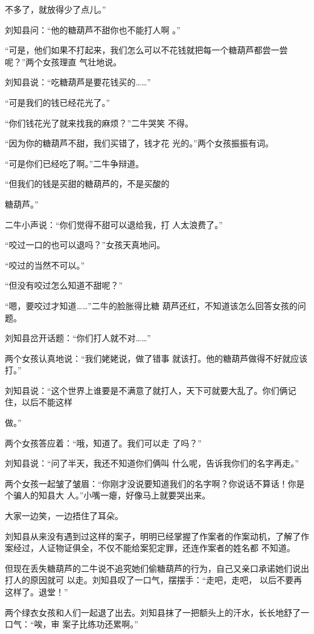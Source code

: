 \documentclass{article}
\begin{document}
\newpage
不多了，就放得少了点儿。” 

刘知县问：“他的糖葫芦不甜你也不能打人啊
。” 

“可是，他们如果不打起来，我们怎么可以不花钱就把每一个糖葫芦都尝一尝呢？”两个女孩理直
气壮地说。 


刘知县说：“吃糖葫芦是要花钱买的……” 


“可是我们的钱已经花光了。” 

“你们钱花光了就来找我的麻烦？”二牛哭笑
不得。 

“因为你的糖葫芦不甜，我们买错了，钱才花
光的。”两个女孩振振有词。 


“可是你们已经吃了啊。”二牛争辩道。 

“但我们的钱是买甜的糖葫芦的，不是买酸的
\newpage

糖葫芦。” 

二牛小声说：“你们觉得不甜可以退给我，打
人太浪费了。” 

“咬过一口的也可以退吗？”女孩天真地问。


“咬过的当然不可以。” 


“但没有咬过怎么知道不甜呢？” 

“嗯，要咬过才知道……”二牛的脸胀得比糖
葫芦还红，不知道该怎么回答女孩的问题。 


刘知县岔开话题：“你们打人就不对……” 

两个女孩认真地说：“我们姥姥说，做了错事
就该打。他的糖葫芦做得不好就应该打。” 

刘知县说：“这个世界上谁要是不满意了就打人，天下可就要大乱了。你们俩记住，以后不能这样
\newpage

做。” 

两个女孩答应着：“哦，知道了。我们可以走
了吗？” 

刘知县说：“问了半天，我还不知道你们俩叫
什么呢，告诉我你们的名字再走。” 

两个女孩一起皱了皱眉：“你刚才没说要知道我们的名字啊？你说话不算话！你是个骗人的知县大
人。”小嘴一瘪，好像马上就要哭出来。 


大家一边笑，一边捂住了耳朵。 

刘知县从来没有遇到过这样的案子，明明已经掌握了作案者的作案动机，了解了作案经过，人证物证俱全，不仅不能给案犯定罪，还连作案者的姓名都
不知道。 

但现在丢失糖葫芦的二牛说不追究她们偷糖葫芦的行为，自己又亲口承诺她们说出打人的原因就可
\newpage
以走。刘知县叹了一口气，摆摆手：“走吧，走吧，
以后不要再这样了。退堂！” 

两个绿衣女孩和人们一起退了出去。刘知县抹了一把额头上的汗水，长长地舒了一口气：“唉，审
案子比练功还累啊。” 
\end{document}
